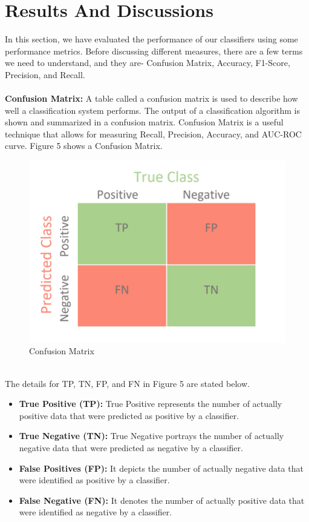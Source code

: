 \documentclass[conference]{IEEEtran}
\begin{document}
\section{Results And Discussions}
In this section, we have evaluated the performance of our classifiers using some performance metrics. Before discussing different measures, there are a few terms we need to understand, and they are- Confusion Matrix, Accuracy, F1-Score, Precision, and Recall. 
\\
\\
\textbf{Confusion Matrix:} A table called a confusion matrix is used to describe how well a classification system performs. The output of a classification algorithm is shown and summarized in a confusion matrix. Confusion Matrix is a useful technique that allows for measuring Recall, Precision, Accuracy, and AUC-ROC curve. Figure 5 shows a Confusion Matrix. 
\begin{figure}[htbp]
  \centering
\includegraphics[width=\columnwidth,height=\textheight,keepaspectratio]{confusion.png}
\caption{Confusion Matrix}
  \label{fig:scope1}
\end{figure}
\\
The details for TP, TN, FP, and FN in Figure 5 are stated below.
\begin{itemize}
\vspace{1mm}
\item 	\textbf{True Positive (TP):} True Positive represents the number of actually positive data that were predicted as positive by a classifier.
\vspace{1mm}
\item 	\textbf{True Negative (TN):} True Negative portrays the number of actually negative data that were predicted as negative by a classifier.
\vspace{1mm}
\item 	\textbf{False Positives (FP):} It depicts the number of actually negative data that were identified as positive by a classifier. 

\vspace{1mm}
\item 	\textbf{False Negative (FN):} It denotes the number of actually positive data that were identified as negative by a classifier.

\end{itemize}
\end{document}
